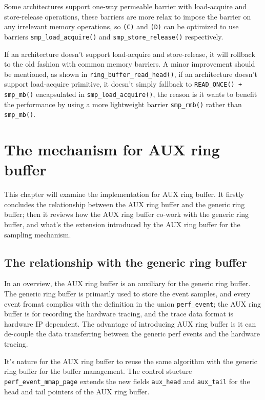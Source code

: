\documentclass[11pt]{diazessay} %
\def\code#1{\texttt{#1}}
\begin{document}
Some architectures support one-way permeable barrier with load-acquire and store-release operations, these barriers are more relax to impose the barrier on any irrelevant memory operations, so \code{(C)} and \code{(D)} can be optimized to use barriers \code{smp\_load\_acquire()} and \code{smp\_store\_release()} respectively.

If an architecture doesn't support load-acquire and store-release, it will rollback to the old fashion with common memory barriers.  A minor improvement should be mentioned, as shown in \code{ring\_buffer\_read\_head()}, if an architecture doesn't support load-acquire primitive, it doesn't simply fallback to \code{READ\_ONCE() + smp\_mb()} encapsulated in \code{smp\_load\_acquire()}, the reason is it wants to benefit the performance by using a more lightweight barrier \code{smp\_rmb()} rather than \code{smp\_mb()}.

\section*{The mechanism for AUX ring buffer}

This chapter will examine the implementation for AUX ring buffer.  It firstly concludes the relationship between the AUX ring buffer and the generic ring buffer;  then it reviews how the AUX ring buffer co-work with the generic ring buffer, and what's the extension introduced by the AUX ring buffer for the sampling mechanism.

\subsection*{The relationship with the generic ring buffer}

In an overview, the AUX ring buffer is an auxiliary for the generic ring buffer.  The generic ring buffer is primarily used to store the event samples, and every event fromat complies with the definition in the union \code{perf\_event}; the AUX ring buffer is for recording the hardware tracing, and the trace data format is hardware IP dependent.  The advantage of introducing AUX ring buffer is it can de-couple the data transferring between the generic perf events and the hardware tracing.

It's nature for the AUX ring buffer to reuse the same algorithm with the generic ring buffer for the buffer management.  The control stucture \code{perf\_event\_mmap\_page} extends the new fields \code{aux\_head} and \code{aux\_tail} for the head and tail pointers of the AUX ring buffer.
\end{document}
